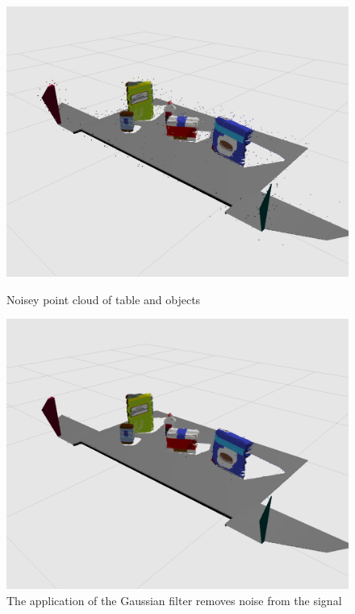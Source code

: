 \documentclass[a4paper]{article}
\begin{document}
\begin{figure}[h]
\centering
\begin{minipage}{0.45\linewidth}
\centering
\includegraphics[scale=0.2]{image11}
\caption{Noisey point cloud of table and objects}
\end{minipage}
\hspace{0.5cm}
\begin{minipage}{0.45\linewidth}
\centering
\includegraphics[scale=0.2]{image5}
\caption{The application of the Gaussian filter removes noise from the signal}
\end{minipage}
\end{figure}
\end{document}
